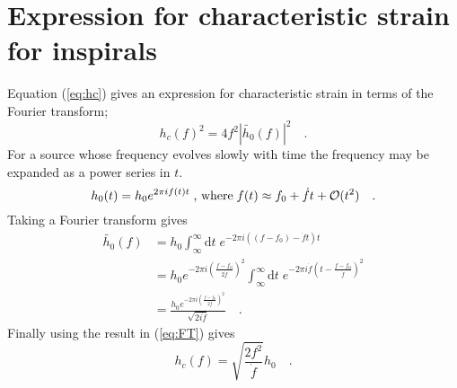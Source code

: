 \section{Expression for characteristic strain for inspirals}
\label{app:b}
Equation (\ref{eq:hc}) gives an expression for characteristic strain in terms of the Fourier transform;
\begin{equation}\label{eq:FT} h_{c}(f)^{2}=4f^{2}\left| \tilde{h_{0}}(f) \right|^{2} \quad . \end{equation}
For a source whose frequency evolves slowly with time the frequency may be expanded as a power series in $t$.
\begin{equation}h_{0}(t)= h_{0}e^{2\pi i f(t)t} \; \textrm{, where} \; f(t) \approx f_{0}+\dot{f}t+{\cal{O}}(t^{2})\quad . \end{equation}
Taking a Fourier transform gives
\begin{eqnarray} 
\tilde{h_{0}}(f)&=h_{0}\int_{\infty}^{\infty}\textrm{d}t\; e^{-2\pi i \left( (f-f_{0})-\dot{f}t \right)t} \nonumber\\
&=h_{0}e^{-2\pi i \left( \frac{f-f_{0}}{2\dot{f}} \right)^{2}}\int_{\infty}^{\infty}\textrm{d}t\; 
	e^{-2\pi i \dot{f}\left( t-\frac{f-f_{0}}{\dot{f}} \right)^{2}} \nonumber\\
&=\frac{h_{0}e^{-2\pi i \left(\frac{f-f_{0}}{2\dot{f}}\right)^{2}}}{\sqrt{2 i \dot{f}}} \quad .
\end{eqnarray}
Finally using the result in (\ref{eq:FT}) gives
\begin{equation} h_{c}(f)=\sqrt{\frac{2f^{2}}{\dot{f}}}h_{0} \quad . \end{equation}

